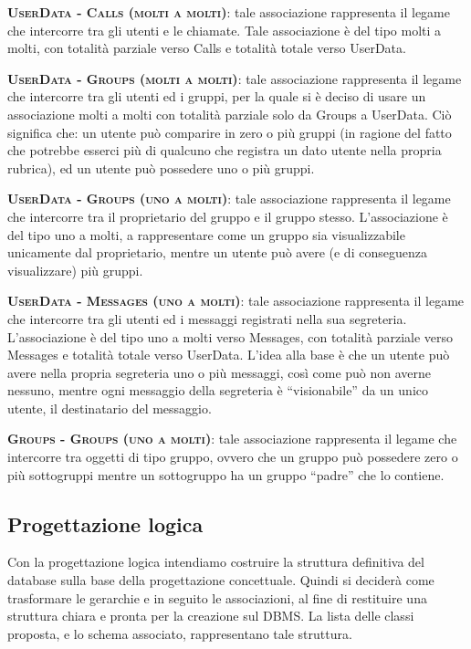 \begin{description}
	\item{\scshape\bfseries UserData - Calls (molti a molti)}: tale associazione rappresenta il legame che intercorre tra gli utenti e le chiamate. Tale associazione è del tipo molti a molti, con totalità parziale verso Calls e totalità totale verso UserData.
	\item{\scshape\bfseries UserData - Groups (molti a molti)}: tale associazione rappresenta il legame che intercorre tra gli utenti ed i gruppi, per la quale si è deciso di usare un associazione molti a molti con totalità parziale solo da Groups a UserData. Ciò significa che: un utente può comparire in zero o più gruppi (in ragione del fatto che potrebbe esserci più di qualcuno che registra un dato utente nella propria rubrica), ed un utente può possedere uno o più gruppi.
	\item{\scshape\bfseries UserData - Groups (uno a molti)}: tale associazione rappresenta il legame che intercorre tra il proprietario del gruppo e il gruppo stesso. L'associazione è del tipo uno a molti, a rappresentare come un gruppo sia visualizzabile unicamente dal proprietario, mentre un utente può avere (e di conseguenza visualizzare) più gruppi.
	\item{\scshape\bfseries UserData - Messages (uno a molti)}: tale associazione rappresenta il legame che intercorre tra gli utenti ed i messaggi registrati nella sua segreteria. L'associazione è del tipo uno a molti verso Messages, con totalità parziale verso Messages e totalità totale verso UserData. L'idea alla base è che un utente può avere nella propria segreteria uno o più messaggi, così come può non averne nessuno, mentre ogni messaggio della segreteria è ``visionabile'' da un unico utente, il destinatario del messaggio.
	\item{\scshape\bfseries Groups - Groups (uno a molti)}: tale associazione rappresenta il legame che intercorre tra oggetti di tipo gruppo, ovvero che un gruppo può possedere zero o più sottogruppi mentre un sottogruppo ha un gruppo ``padre'' che lo contiene.
\end{description}

\subsection{Progettazione logica}
Con la progettazione logica intendiamo costruire la struttura definitiva del database sulla base della progettazione concettuale. Quindi si deciderà come trasformare le gerarchie e in seguito le associazioni, al fine di restituire una struttura chiara e pronta per la creazione sul DBMS\@. La lista delle classi proposta, e lo schema associato, rappresentano tale struttura.

